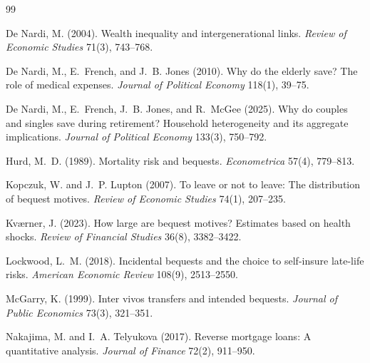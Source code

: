 \documentclass[10pt]{article}
\begin{document}
\small
\begin{thebibliography}{99}

De Nardi, M. (2004).
Wealth inequality and intergenerational links.
\emph{Review of Economic Studies} 71(3), 743--768.

De Nardi, M., E.~French, and J.~B. Jones (2010).
Why do the elderly save? The role of medical expenses.
\emph{Journal of Political Economy} 118(1), 39--75.

De Nardi, M., E.~French, J.~B. Jones, and R.~McGee (2025).
Why do couples and singles save during retirement? Household heterogeneity
and its aggregate implications.
\emph{Journal of Political Economy} 133(3), 750--792.

Hurd, M.~D. (1989).
Mortality risk and bequests.
\emph{Econometrica} 57(4), 779--813.

Kopczuk, W. and J.~P. Lupton (2007).
To leave or not to leave: The distribution of bequest motives.
\emph{Review of Economic Studies} 74(1), 207--235.

Kv\ae rner, J. (2023).
How large are bequest motives? Estimates based on health shocks.
\emph{Review of Financial Studies} 36(8), 3382--3422.

Lockwood, L.~M. (2018).
Incidental bequests and the choice to self-insure late-life risks.
\emph{American Economic Review} 108(9), 2513--2550.

McGarry, K. (1999).
Inter vivos transfers and intended bequests.
\emph{Journal of Public Economics} 73(3), 321--351.

Nakajima, M. and I.~A. Telyukova (2017).
Reverse mortgage loans: A quantitative analysis.
\emph{Journal of Finance} 72(2), 911--950.

\end{thebibliography}
\end{document}
